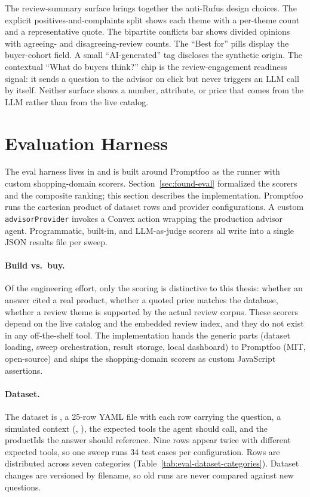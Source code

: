 The review-summary surface brings together the anti-Rufus
design choices. The explicit positives-and-complaints split
shows each theme with a per-theme count and a representative
quote. The bipartite conflicts bar shows divided opinions with
agreeing- and disagreeing-review counts. The ``Best for'' pills
display the buyer-cohort field. A small ``AI-generated'' tag
discloses the synthetic origin. The contextual
``What do buyers think?'' chip is the review-engagement
readiness signal: it sends a question to the advisor on click
but never triggers an LLM call by itself. Neither surface shows
a number, attribute, or price that comes from the LLM rather
than from the live catalog.

\section{Evaluation Harness}
\label{sec:sys-eval}

The eval harness lives in  and is built
around Promptfoo as the runner with custom shopping-domain
scorers. Section~\ref{sec:found-eval} formalized the scorers and
the composite ranking; this section describes the implementation.
Promptfoo runs the cartesian product of dataset rows and provider
configurations. A custom \texttt{advisorProvider} invokes a
Convex action wrapping the production advisor agent.
Programmatic, built-in, and LLM-as-judge scorers all write into
a single JSON results file per sweep.

\paragraph{Build vs.\ buy.} Of the engineering effort, only the
scoring is distinctive to this thesis: whether an answer cited a
real product, whether a
quoted price matches the database, whether a review theme is
supported by the actual review corpus. These scorers depend on
the live catalog and the embedded review index, and they do not
exist in any off-the-shelf tool. The implementation hands the
generic parts (dataset loading, sweep orchestration, result
storage, local dashboard) to Promptfoo (MIT, open-source) and
ships the shopping-domain scorers as custom JavaScript
assertions.

\paragraph{Dataset.} The dataset is
, a 25-row YAML file with
each row carrying the question, a simulated context
(, ), the expected
tools the agent should call, and the productIds the answer
should reference. Nine rows appear twice with different expected
tools, so one sweep runs 34 test cases per configuration. Rows
are distributed across seven categories
(Table~\ref{tab:eval-dataset-categories}). Dataset changes are
versioned by filename, so old runs are never compared against
new questions.


